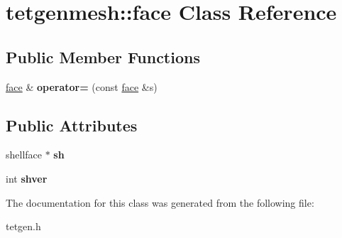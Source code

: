 \hypertarget{classtetgenmesh_1_1face}{}\section{tetgenmesh\+:\+:face Class Reference}
\label{classtetgenmesh_1_1face}
\subsection*{Public Member Functions}
\begin{DoxyCompactItemize}
\item 
\mbox{\label{classtetgenmesh_1_1face_a1321d78f189cee6bc26d71a985ee8dbe}} 
\hyperlink{classtetgenmesh_1_1face}{face} \& {\bfseries operator=} (const \hyperlink{classtetgenmesh_1_1face}{face} \&s)
\end{DoxyCompactItemize}
\subsection*{Public Attributes}
\begin{DoxyCompactItemize}
\item 
\mbox{\label{classtetgenmesh_1_1face_a0ebac53728a624fcb6528a7d2571b987}} 
shellface $\ast$ {\bfseries sh}
\item 
\mbox{\label{classtetgenmesh_1_1face_a990a58ccf240d0d4197c2a923a1853d6}} 
int {\bfseries shver}
\end{DoxyCompactItemize}


The documentation for this class was generated from the following file\+:\begin{DoxyCompactItemize}
\item 
tetgen.\+h\end{DoxyCompactItemize}
